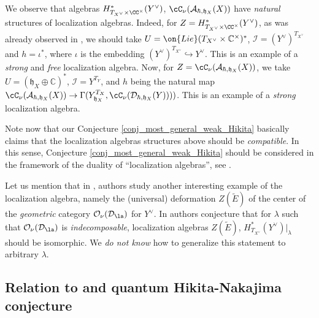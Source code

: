 \documentclass[12pt]{amsart}
\begin{document}
We observe that algebras $H^*_{T_{X^\vee} \times \CC^\times}(Y^\vee)$, $\cC_\nu(\mathcal{A}_{\hbar,\mathfrak{h}_{X}}(X))$ have {\emph{natural}} structures of localization algebras. Indeed, for $Z=H^*_{T_{X^\vee} \times \CC^\times}(Y^\vee)$, as was already observed in \cite[Example 2.2]{localiz_alg}, we should take $U=\on{Lie}(T_{X^\vee} \times \mathbb{C}^\times)^*$, $\mathcal{I}=(Y^\vee)^{T_{X^\vee}}$ and $h=\iota^*$, where $\iota$ is the embedding $(Y^\vee)^{T_{X^\vee}} \hookrightarrow Y^\vee$. This is an example of a {\emph{strong}} and {\emph{free}} localization algebra. Now, for $Z=\cC_\nu(\mathcal{A}_{\hbar,\mathfrak{h}_{X}}(X))$, we take $U=(\mathfrak{h}_X \oplus \mathbb{C})^*$, $\mathcal{I}=Y^{T_{Y}}$, and $h$ being the natural map $\cC_\nu(\mathcal{A}_{\hbar,\mathfrak{h}_X}(X)) \rightarrow \Gamma(Y_{\mathfrak{h}_X}^{T_X},\cC_\nu(\mathcal{D}_{\hbar,\mathfrak{h}_X}(Y))))$. This is an example of a {\emph{strong}} localization algebra. 

Note now that our Conjecture \ref{conj_most_general_weak_Hikita} basically claims that the localization algebras structures above should be {\emph{compatible}}. 
In this sense, Conjecture \ref{conj_most_general_weak_Hikita} should be considered in the framework of the duality of  ``localization algebras'', see \cite[Section 10.6]{BPWII}.


Let us mention that in \cite[Section 10.6]{BPWII}, \cite{localiz_alg} authors study another interesting example of the localization algebra, namely the (universal) deformation $Z(\widetilde{E})$ of the center of the {\emph{geometric}} category $\mathcal{O}_\nu(\mathcal{D}_\la)$ for $Y^\vee$. In \cite[Conjecture 10.32]{BPWII} authors conjecture that for $\lambda$ such that $\mathcal{O}_\nu(\mathcal{D}_\la)$ is {\emph{indecomposable}}, localization algebras $Z(\widetilde{E})$, $H^*_{T_{X^\vee}}(Y^\vee)|_{\lambda}$ should be isomorphic. We {\emph{do not know}} how to generalize this statement to arbitrary $\lambda$.




\subsection{Relation to \cite{votices_vermas} and quantum Hikita-Nakajima conjecture}
\end{document}

